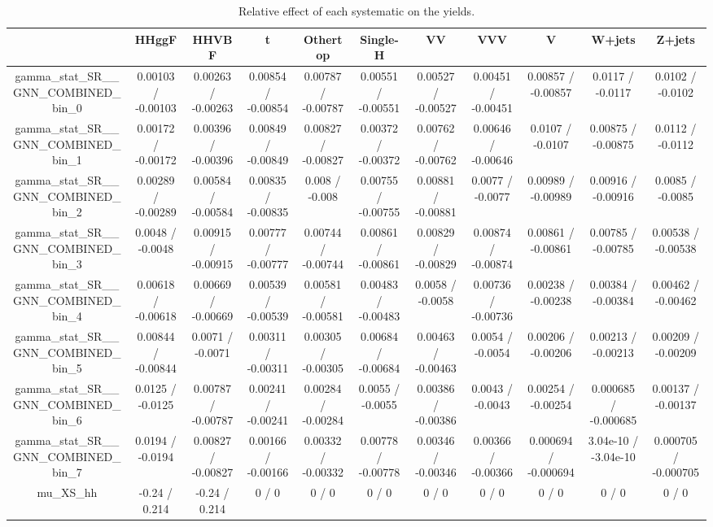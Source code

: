\documentclass[10pt]{article}
\begin{document}
\begin{table}[htbp]
\begin{center}
\begin{tabular}{|c|c|c|c|c|c|c|c|c|c|c|}
\hline 
      & HHggF      & HHVBF      & t      & Othertop      & Single-H      & VV      & VVV      & V      & W+jets      & Z+jets \\ 
\hline 
  gamma_stat_SR__GNN_COMBINED_bin_0 & 0.00103 / -0.00103 & 0.00263 / -0.00263 & 0.00854 / -0.00854 & 0.00787 / -0.00787 & 0.00551 / -0.00551 & 0.00527 / -0.00527 & 0.00451 / -0.00451 & 0.00857 / -0.00857 & 0.0117 / -0.0117 & 0.0102 / -0.0102 \\ 
  gamma_stat_SR__GNN_COMBINED_bin_1 & 0.00172 / -0.00172 & 0.00396 / -0.00396 & 0.00849 / -0.00849 & 0.00827 / -0.00827 & 0.00372 / -0.00372 & 0.00762 / -0.00762 & 0.00646 / -0.00646 & 0.0107 / -0.0107 & 0.00875 / -0.00875 & 0.0112 / -0.0112 \\ 
  gamma_stat_SR__GNN_COMBINED_bin_2 & 0.00289 / -0.00289 & 0.00584 / -0.00584 & 0.00835 / -0.00835 & 0.008 / -0.008 & 0.00755 / -0.00755 & 0.00881 / -0.00881 & 0.0077 / -0.0077 & 0.00989 / -0.00989 & 0.00916 / -0.00916 & 0.0085 / -0.0085 \\ 
  gamma_stat_SR__GNN_COMBINED_bin_3 & 0.0048 / -0.0048 & 0.00915 / -0.00915 & 0.00777 / -0.00777 & 0.00744 / -0.00744 & 0.00861 / -0.00861 & 0.00829 / -0.00829 & 0.00874 / -0.00874 & 0.00861 / -0.00861 & 0.00785 / -0.00785 & 0.00538 / -0.00538 \\ 
  gamma_stat_SR__GNN_COMBINED_bin_4 & 0.00618 / -0.00618 & 0.00669 / -0.00669 & 0.00539 / -0.00539 & 0.00581 / -0.00581 & 0.00483 / -0.00483 & 0.0058 / -0.0058 & 0.00736 / -0.00736 & 0.00238 / -0.00238 & 0.00384 / -0.00384 & 0.00462 / -0.00462 \\ 
  gamma_stat_SR__GNN_COMBINED_bin_5 & 0.00844 / -0.00844 & 0.0071 / -0.0071 & 0.00311 / -0.00311 & 0.00305 / -0.00305 & 0.00684 / -0.00684 & 0.00463 / -0.00463 & 0.0054 / -0.0054 & 0.00206 / -0.00206 & 0.00213 / -0.00213 & 0.00209 / -0.00209 \\ 
  gamma_stat_SR__GNN_COMBINED_bin_6 & 0.0125 / -0.0125 & 0.00787 / -0.00787 & 0.00241 / -0.00241 & 0.00284 / -0.00284 & 0.0055 / -0.0055 & 0.00386 / -0.00386 & 0.0043 / -0.0043 & 0.00254 / -0.00254 & 0.000685 / -0.000685 & 0.00137 / -0.00137 \\ 
  gamma_stat_SR__GNN_COMBINED_bin_7 & 0.0194 / -0.0194 & 0.00827 / -0.00827 & 0.00166 / -0.00166 & 0.00332 / -0.00332 & 0.00778 / -0.00778 & 0.00346 / -0.00346 & 0.00366 / -0.00366 & 0.000694 / -0.000694 & 3.04e-10 / -3.04e-10 & 0.000705 / -0.000705 \\ 
  mu_XS_hh & -0.24 / 0.214 & -0.24 / 0.214 & 0 / 0 & 0 / 0 & 0 / 0 & 0 / 0 & 0 / 0 & 0 / 0 & 0 / 0 & 0 / 0 \\ 
\hline 
\end{tabular} 
\caption{Relative effect of each systematic on the yields.} 
\end{center} 
\end{table} 
\end{document}
